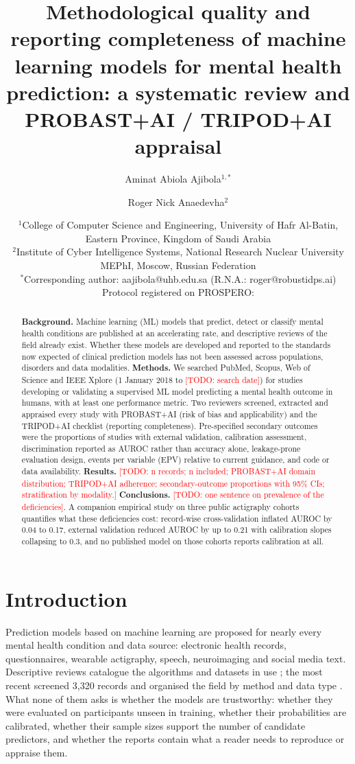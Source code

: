 \documentclass[11pt,a4paper]{article}
\title{Methodological quality and reporting completeness of machine learning models for mental health prediction: a systematic review and PROBAST+AI / TRIPOD+AI appraisal}
\author{Aminat Abiola Ajibola$^{1,*}$ \and Roger Nick Anaedevha$^{2}$}
\date{\footnotesize $^{1}$College of Computer Science and Engineering, University of Hafr Al-Batin, Eastern Province, Kingdom of Saudi Arabia \\
$^{2}$Institute of Cyber Intelligence Systems, National Research Nuclear University MEPhI, Moscow, Russian Federation \\[0.3em]
$^{*}$Corresponding author: aajibola@uhb.edu.sa \quad (R.N.A.: roger@robustidps.ai) \\[0.4em]
Protocol registered on PROSPERO: \todo{CRD number}}
\newcommand{\todo}[1]{\textcolor{red}{[TODO: #1]}}
\begin{document}
\maketitle
\linenumbers

\begin{abstract}
\textbf{Background.} Machine learning (ML) models that predict, detect or classify mental health
conditions are published at an accelerating rate, and descriptive reviews of the field already
exist. Whether these models are developed and reported to the standards now expected of clinical
prediction models has not been assessed across populations, disorders and data modalities.
\textbf{Methods.} We searched PubMed, Scopus, Web of Science and IEEE Xplore (1 January 2018 to
\todo{search date}) for studies developing or validating a supervised ML model predicting a mental
health outcome in humans, with at least one performance metric. Two reviewers screened,
extracted and appraised every study with PROBAST+AI (risk of bias and applicability) and the
TRIPOD+AI checklist (reporting completeness). Pre-specified secondary outcomes were the
proportions of studies with external validation, calibration assessment, discrimination reported
as AUROC rather than accuracy alone, leakage-prone evaluation design, events per variable (EPV)
relative to current guidance, and code or data availability.
\textbf{Results.} \todo{n records; n included; PROBAST+AI domain distribution; TRIPOD+AI
adherence; secondary-outcome proportions with 95\% CIs; stratification by modality.}
\textbf{Conclusions.} \todo{one sentence on prevalence of the deficiencies}. A companion empirical
study on three public actigraphy cohorts quantifies what these deficiencies cost: record-wise
cross-validation inflated AUROC by 0.04 to 0.17, external validation reduced AUROC by up to 0.21
with calibration slopes collapsing to 0.3, and no published model on those cohorts reports
calibration at all.
\end{abstract}

\section{Introduction}
Prediction models based on machine learning are proposed for nearly every mental health
condition and data source: electronic health records, questionnaires, wearable actigraphy, speech,
neuroimaging and social media text. Descriptive reviews catalogue the algorithms and datasets in
use \cite{hasan2026,madububambachu2024}; the most recent screened 3{,}320 records and organised
the field by method and data type \cite{hasan2026}. What none of them asks is whether the models
are trustworthy: whether they were evaluated on participants unseen in training, whether their
probabilities are calibrated, whether their sample sizes support the number of candidate
predictors, and whether the reports contain what a reader needs to reproduce or appraise them.
\end{document}
